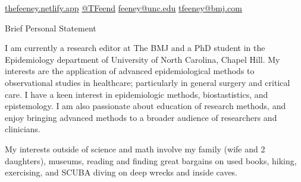 \documentclass{resume} %
\begin{document}
%

\begin{center} 
 \href{https://thefeeney.netlify.app}{thefeeney.netlify.app}
 \hfill
 \href{https://twitter.com/TFeend}{@TFeend}
  \hfill
  \href{mailto:feeney@unc.edu}{feeney@unc.edu}
  \hfill
  \href{mailto:tfeeney@bmj.com}{tfeeney@bmj.com}
  \hfill
  \end{center}

\begin{rSection}{Brief Personal Statement}

{I am currently a research editor at The BMJ and a PhD student in the Epidemiology department of University of North Carolina, Chapel Hill. My interests are the application of advanced epidemiological methods to observational studies in healthcare; particularly in general surgery and critical care. I have a keen interest in epidemiologic methods, biostastistics, and epistemology. I am also passionate about education of research methods, and enjoy bringing advanced methods to a broader audience of researchers and clinicians.

My interests outside of science and math involve my family (wife and 2 daughters), museums, reading and finding great bargains on used books, hiking, exercising, and SCUBA diving on deep wrecks and inside caves.}

\end{rSection}
\end{document}

